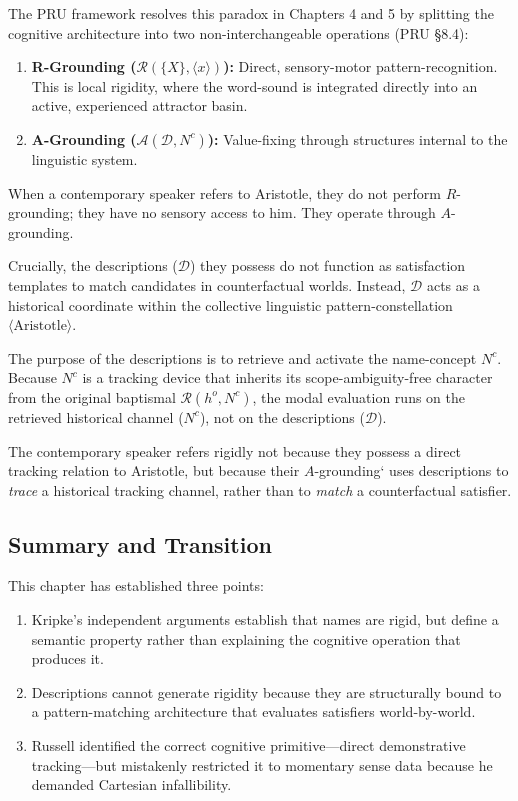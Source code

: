 \documentclass[12pt,a4paper]{article}
\providecommand{\tightlist}{}
\begin{document}
The PRU framework resolves this paradox in Chapters 4 and 5 by splitting the cognitive architecture into two non-interchangeable operations (PRU §8.4):

\begin{enumerate}
\def\labelenumi{\arabic{enumi}.}
\tightlist
\item
  \textbf{R-Grounding (\(\mathcal{R}(\{X\}, \langle x \rangle)\)):} Direct, sensory-motor pattern-recognition. This is local rigidity, where the word-sound is integrated directly into an active, experienced attractor basin.
\item
  \textbf{A-Grounding (\(\mathcal{A}(\mathcal{D}, N^c)\)):} Value-fixing through structures internal to the linguistic system.
\end{enumerate}

When a contemporary speaker refers to Aristotle, they do not perform \(R\)-grounding; they have no sensory access to him. They operate through \(A\)-grounding.

Crucially, the descriptions (\(\mathcal{D}\)) they possess do not function as satisfaction templates to match candidates in counterfactual worlds. Instead, \(\mathcal{D}\) acts as a historical coordinate within the collective linguistic pattern-constellation \(\langle \text{Aristotle} \rangle\).

The purpose of the descriptions is to retrieve and activate the name-concept \(N^c\). Because \(N^c\) is a tracking device that inherits its scope-ambiguity-free character from the original baptismal \(\mathcal{R}(h^o, N^c)\), the modal evaluation runs on the retrieved historical channel (\(N^c\)), not on the descriptions (\(\mathcal{D}\)).

The contemporary speaker refers rigidly not because they possess a direct tracking relation to Aristotle, but because their \(A\)-grounding` uses descriptions to \emph{trace} a historical tracking channel, rather than to \emph{match} a counterfactual satisfier.

\subsection{Summary and Transition}\label{summary-and-transition}

This chapter has established three points:

\begin{enumerate}
\def\labelenumi{\arabic{enumi}.}
\tightlist
\item
  Kripke's independent arguments establish that names are rigid, but define a semantic property rather than explaining the cognitive operation that produces it.
\item
  Descriptions cannot generate rigidity because they are structurally bound to a pattern-matching architecture that evaluates satisfiers world-by-world.
\item
  Russell identified the correct cognitive primitive---direct demonstrative tracking---but mistakenly restricted it to momentary sense data because he demanded Cartesian infallibility.
\end{enumerate}
\end{document}
